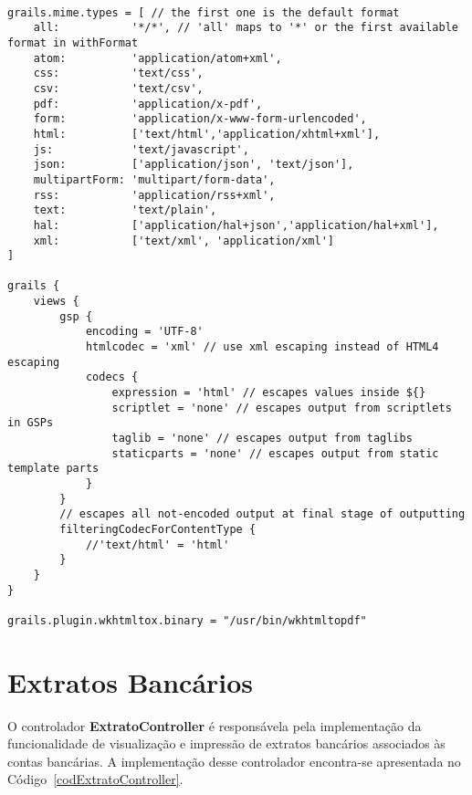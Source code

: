 \begin{lstlisting}[caption={\bf    Config.groovy},    frame=trBL,    float=htbp,
    label=codConfig]

grails.mime.types = [ // the first one is the default format
    all:           '*/*', // 'all' maps to '*' or the first available format in withFormat
    atom:          'application/atom+xml',
    css:           'text/css',
    csv:           'text/csv',
    pdf:           'application/x-pdf',
    form:          'application/x-www-form-urlencoded',
    html:          ['text/html','application/xhtml+xml'],
    js:            'text/javascript',
    json:          ['application/json', 'text/json'],
    multipartForm: 'multipart/form-data',
    rss:           'application/rss+xml',
    text:          'text/plain',
    hal:           ['application/hal+json','application/hal+xml'],
    xml:           ['text/xml', 'application/xml']
]

grails {
    views {
        gsp {
            encoding = 'UTF-8'
            htmlcodec = 'xml' // use xml escaping instead of HTML4 escaping
            codecs {
                expression = 'html' // escapes values inside ${}
                scriptlet = 'none' // escapes output from scriptlets in GSPs
                taglib = 'none' // escapes output from taglibs
                staticparts = 'none' // escapes output from static template parts
            }
        }
        // escapes all not-encoded output at final stage of outputting
        filteringCodecForContentType {
            //'text/html' = 'html'
        }
    }
}
 
grails.plugin.wkhtmltox.binary = "/usr/bin/wkhtmltopdf"
\end{lstlisting}

\section{Extratos Bancários}

\vspace{0.5cm}

O  controlador  {\bf ExtratoController}  é  responsávela  pela implementação  da
funcionalidade de  visualização e impressão de extratos  bancários associados às
contas bancárias.  A implementação desse controlador  encontra-se apresentada no
Código~\ref{codExtratoController}. 

